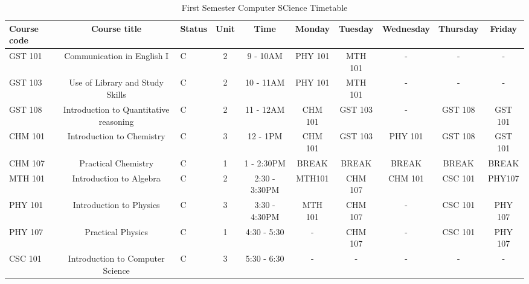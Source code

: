 \documentclass{article}
\begin{document}
	
	\begin{sidewaystable}[h!]
		\begin{center}
			\caption{First Semester Computer SCience Timetable}
			\label{tab:table1}
		\begin{tabular}{l|c|l|c|c|c|c|c|c|c}
        \textbf{Course code} & \textbf{Course title} & \textbf{Status} & \textbf{Unit}
        & \textbf{Time} & \textbf{Monday} & \textbf{Tuesday} & \textbf{Wednesday} & \textbf{Thursday} & \textbf{Friday}\\
        \hline
      \cellcolor{red!35}GST 101 & Communication in English I & C & 2 & 9 - 10AM & PHY 101 & MTH 101 & - & - & - \\
        \cellcolor{red!35}GST 103 & Use of Library and Study Skills & C & 2 & 10 - 11AM & PHY 101 & MTH 101 & - & - & - \\
        \cellcolor{red!35}GST 108 & Introduction to Quantitative reasoning & C & 2 & 11 - 12AM & CHM 101 & GST 103 & - & GST 108 & GST 101\\
        \cellcolor{red!35}CHM 101 & Introduction to Chemistry & C & 3 & 12 - 1PM & CHM 101 & GST 103 & PHY 101 & GST 108 & GST 101\\
        \cellcolor{red!35}CHM 107 & Practical Chemistry & C & 1 & 1 - 2:30PM & BREAK & BREAK & BREAK & BREAK & BREAK\\
        \cellcolor{red!35}MTH 101 & Introduction to Algebra & C & 2 & 2:30 - 3:30PM & MTH101 & CHM 107 & CHM 101 & CSC 101 & PHY107\\
        \cellcolor{red!35}PHY 101 & Introduction to Physics & C & 3 & 3:30 - 4:30PM & MTH 101 & CHM 107 & - & CSC 101 & PHY 107\\
        \cellcolor{red!35}PHY 107 & Practical Physics & C & 1 & 4:30 - 5:30 & - & CHM 107 & - & CSC 101 & PHY 107\\
        \cellcolor{red!35}CSC 101 & Introduction to Computer Science & C & 3 & 5:30 - 6:30 & - & - & - & - & -\\
        \hline
     \end{tabular}
     
         
		\end{center}
	\end{sidewaystable}
\end{document}
